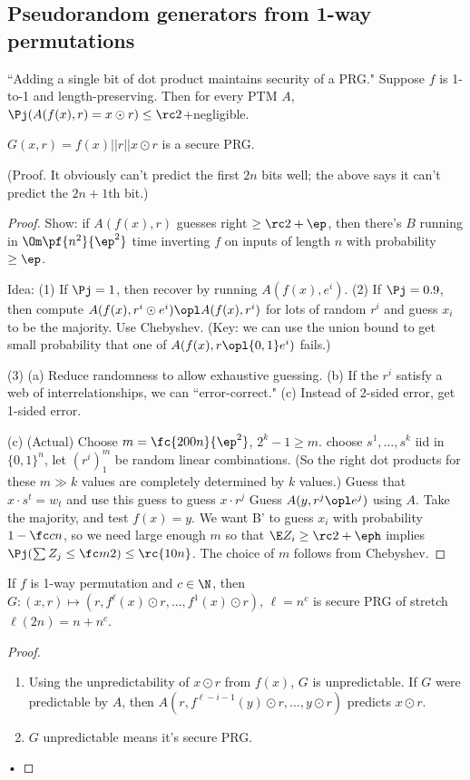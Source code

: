 \subsection{Pseudorandom generators from 1-way permutations}

\begin{thm}
``Adding a single bit of dot product maintains security of a PRG."
Suppose $f$ is 1-to-1 and length-preserving. Then for every PTM $A$, $\Pj(A(f(x),r)=x\odot r)\le \rc2$+negligible.
\end{thm}
\begin{cor}
$G(x,r)=f(x)||r||x\odot r$ is a secure PRG.
\end{cor}
(Proof. It obviously can't predict the first $2n$ bits well; the above says it can't predict the $2n+1$th bit.)
\begin{proof}
Show: if $A(f(x),r)$ guesses right $\ge\rc2+ \ep$, then there's $B$ running in $\Om\pf{n^2}{\ep^2}$ time inverting $f$ on inputs of length $n$ with probability $\ge \ep$.

Idea: (1) If $\Pj=1$, then recover by running $A(f(x),e^i)$. (2) If $\Pj=0.9$, then compute $A(f(x),r^i\odot e^i)\opl A(f(x),r^i)$ for lots of random $r^i$ and guess $x_i$ to be the majority. Use Chebyshev. (Key: we can use the union bound to get small probability that one of $A(f(x),r\opl\{0,1\} e^i)$ fails.) 

(3) (a) Reduce randomness to allow exhaustive guessing. (b) If the $r^i$ satisfy a web of interrelationships, we can ``error-correct." (c) Instead of 2-sided error, get 1-sided error.

(c) (Actual) Choose $m=\fc{200n}{\ep^2}$, $2^k-1\ge m$. 
choose $s^1,\ldots, s^k$ iid in $\{0,1\}^n$, let $(r^i)_1^m$ be random linear combinations. (So the right dot products for these $m\gg k$ values are completely determined by $k$ values.) Guess that $x\cdot s^t=w_t$ and use this guess to guess $x\cdot r^j$ Guess $A(y,r^j\opl e^j)$ using $A$. Take the majority, and test $f(x)=y$. We want B' to guess $x_i$ with probability $1-\fc cn$, so we need large enough $m$ so that $\E Z_i\ge \rc2+\eph$ implies $\Pj(\sum Z_j\le \fc m2)\le \rc{10n}$. The choice of $m$ follows from Chebyshev.
\end{proof}
\begin{thm}
If $f$ is 1-way permutation and $c\in \N$, then $G:(x,r)\mapsto (r,f^\ell(x)\odot r,\ldots, f^1(x)\odot r)$, $\ell=n^c$ is secure PRG of stretch $\ell(2n)=n+n^c$.
\end{thm}
\begin{proof}
\begin{enumerate}
\item
Using the unpredictability of $x\odot r$ from $f(x)$, $G$ is unpredictable. If $G$ were predictable by $A$, then $A(r,f^{\ell-i-1}(y)\odot r,\ldots,y\odot r)$ predicts $x\odot r$.
\item $G$ unpredictable means it's secure PRG.
\end{enumerate}•
\end{proof}

